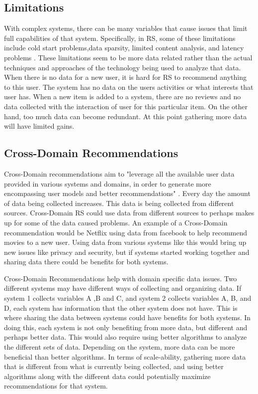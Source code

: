 \documentclass[sigconf]{acmart}
\begin{document}
\subsection{Limitations}
With complex systems, there can be many variables that cause issues that limit full capabilities of that system. Specifically, in RS, some of these limitations include cold start problems,data sparsity, limited content analysis, and latency problems \cite{Khusro2016}. These limitations seem to be more data related rather than the actual techniques and approaches of the technology being used to analyze that data. When there is no data for a new user, it is hard for RS to recommend anything to this user. The system has no data on the users activities or what interests that user has. When a new item is added to a system, there are no reviews and no data collected with the interaction of user for this particular item. On the other hand, too much data can become redundant. At this point gathering more data will have limited gains. 

\subsection{Cross-Domain Recommendations}
Cross-Domain recommendations aim to "leverage all the available user data provided in various systems and
domains, in order to generate more encompassing user models and better recommendations" \cite{Cantador2015}.
Every day the amount of data being collected increases. This data is being collected from different sources.
Cross-Domain RS could use data from different sources to perhaps makes up for some of the data caused
problems. An example of a Cross-Domain recommendation would be Netflix using data from facebook to help recommend movies to a new user. Using data from various systems like this would bring up new issues like privacy and security, but if systems started working together and sharing data there could be benefits for both systems. 

Cross-Domain Recommendations help with domain specific data issues. Two different systems may have different ways of collecting and organizing data. If system 1 collects variables A ,B and C, and system 2 collects variables A, B, and D, each system has information that the other system does not have. This is where sharing the data between systems could have benefits for both systems. In doing this, each system is not only benefiting from more data, but different and perhaps better data. This would also require using better algorithms to analyze the different sets of data. Depending on the system, more data  can be more beneficial than better algorithms. In terms of scale-ability, gathering more data that is different from what is currently being collected, and using better algorithms along with the different data could potentially maximize recommendations for that system.
\end{document}
